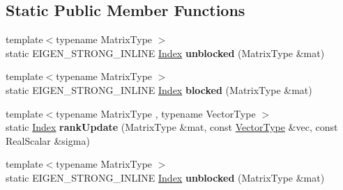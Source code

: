 \subsection*{Static Public Member Functions}
\begin{DoxyCompactItemize}
\item 
\mbox{\label{struct_eigen_1_1internal_1_1llt__inplace_3_01_scalar_00_01_upper_01_4_a463cfb3c179e758d90d60a2922d6ce56}} 
{\footnotesize template$<$typename Matrix\+Type $>$ }\\static E\+I\+G\+E\+N\+\_\+\+S\+T\+R\+O\+N\+G\+\_\+\+I\+N\+L\+I\+NE \hyperlink{namespace_eigen_a62e77e0933482dafde8fe197d9a2cfde}{Index} {\bfseries unblocked} (Matrix\+Type \&mat)
\item 
\mbox{\label{struct_eigen_1_1internal_1_1llt__inplace_3_01_scalar_00_01_upper_01_4_a9d0bd12c1bf77e80e6d6d6b32fb19989}} 
{\footnotesize template$<$typename Matrix\+Type $>$ }\\static E\+I\+G\+E\+N\+\_\+\+S\+T\+R\+O\+N\+G\+\_\+\+I\+N\+L\+I\+NE \hyperlink{namespace_eigen_a62e77e0933482dafde8fe197d9a2cfde}{Index} {\bfseries blocked} (Matrix\+Type \&mat)
\item 
\mbox{\label{struct_eigen_1_1internal_1_1llt__inplace_3_01_scalar_00_01_upper_01_4_ab044cd63f44a77c7638ac58b772cec43}} 
{\footnotesize template$<$typename Matrix\+Type , typename Vector\+Type $>$ }\\static \hyperlink{namespace_eigen_a62e77e0933482dafde8fe197d9a2cfde}{Index} {\bfseries rank\+Update} (Matrix\+Type \&mat, const \hyperlink{struct_vector_type}{Vector\+Type} \&vec, const Real\+Scalar \&sigma)
\item 
\mbox{\label{struct_eigen_1_1internal_1_1llt__inplace_3_01_scalar_00_01_upper_01_4_a463cfb3c179e758d90d60a2922d6ce56}} 
{\footnotesize template$<$typename Matrix\+Type $>$ }\\static E\+I\+G\+E\+N\+\_\+\+S\+T\+R\+O\+N\+G\+\_\+\+I\+N\+L\+I\+NE \hyperlink{namespace_eigen_a62e77e0933482dafde8fe197d9a2cfde}{Index} {\bfseries unblocked} (Matrix\+Type \&mat)
\item 

\end{DoxyCompactItemize}
